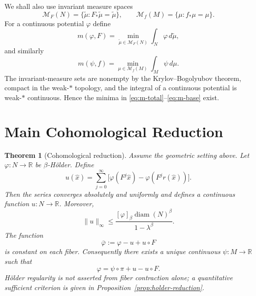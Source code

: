 \documentclass[11pt,a4paper]{article}
\newtheorem{theorem}{Theorem}[section]
\newcommand{\R}{\mathbb R}
\newcommand{\M}{\mathcal M}
\newcommand{\diam}{\operatorname{diam}}
\begin{document}
We shall also use invariant measure spaces
\[
\M_F(N)=\{\widetilde\mu:F_*\widetilde\mu=\widetilde\mu\},
\qquad
\M_f(M)=\{\mu:f_*\mu=\mu\}.
\]
For a continuous potential $\varphi$ define
\begin{equation}
m(\varphi,F)
=
\min_{\widetilde\mu\in\M_F(N)}
\int_N\varphi\,d\widetilde\mu,
\label{eq:m-total}
\end{equation}
and similarly
\begin{equation}
m(\psi,f)
=
\min_{\mu\in\M_f(M)}
\int_M\psi\,d\mu.
\label{eq:m-base}
\end{equation}
The invariant-measure sets are nonempty by the Krylov--Bogolyubov theorem,
compact in the weak-$*$ topology, and the integral of a continuous potential
is weak-$*$ continuous. Hence the minima in
\eqref{eq:m-total}--\eqref{eq:m-base} exist.

\section{Main Cohomological Reduction}\label{sec:reduction}

\begin{theorem}[Cohomological reduction]
\label{thm:reduction}
Assume the geometric setting above. Let $\varphi:N\to\R$ be
$\beta$-H\"older. Define
\begin{equation}
 u(\hat x)=\sum_{j=0}^{\infty}
 \bigl[\varphi(F^j\hat x)-\varphi(F^jr(\hat x))\bigr].
 \label{eq:u-series-main}
\end{equation}
Then the series converges absolutely and uniformly and defines a continuous
function $u:N\to\R$. Moreover,
\begin{equation}
 \|u\|_\infty\le
 \frac{[\varphi]_\beta\diam(N)^\beta}{1-\lambda^\beta}.
 \label{eq:u-sup-bound}
\end{equation}
The function
\[
 \bar\varphi:=\varphi-u+u\circ F
\]
is constant on each fiber. Consequently there exists a unique continuous
$\psi:M\to\R$ such that
\begin{equation}
 \boxed{\varphi=\psi\circ\pi+u-u\circ F.}
 \label{eq:main-cohomology}
\end{equation}
H\"older regularity is not asserted from fiber contraction alone; a
quantitative sufficient criterion is given in
Proposition~\ref{prop:holder-reduction}.
\end{theorem}
\end{document}
